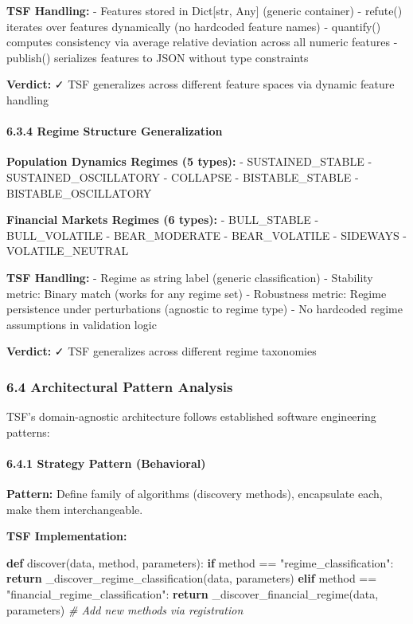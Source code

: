 \documentclass[
]{article}
\newenvironment{Shaded}{}{}
\newcommand{\CommentTok}[1]{\textcolor[rgb]{0.38,0.63,0.69}{\textit{#1}}}
\newcommand{\ControlFlowTok}[1]{\textcolor[rgb]{0.00,0.44,0.13}{\textbf{#1}}}
\newcommand{\KeywordTok}[1]{\textcolor[rgb]{0.00,0.44,0.13}{\textbf{#1}}}
\newcommand{\NormalTok}[1]{#1}
\newcommand{\OperatorTok}[1]{\textcolor[rgb]{0.40,0.40,0.40}{#1}}
\newcommand{\StringTok}[1]{\textcolor[rgb]{0.25,0.44,0.63}{#1}}
\begin{document}
\textbf{TSF Handling:} - Features stored in Dict{[}str, Any{]} (generic
container) - refute() iterates over features dynamically (no hardcoded
feature names) - quantify() computes consistency via average relative
deviation across all numeric features - publish() serializes features to
JSON without type constraints

\textbf{Verdict:} ✓ TSF generalizes across different feature spaces via
dynamic feature handling

\paragraph{6.3.4 Regime Structure
Generalization}\label{regime-structure-generalization}

\textbf{Population Dynamics Regimes (5 types):} - SUSTAINED\_STABLE -
SUSTAINED\_OSCILLATORY - COLLAPSE - BISTABLE\_STABLE -
BISTABLE\_OSCILLATORY

\textbf{Financial Markets Regimes (6 types):} - BULL\_STABLE -
BULL\_VOLATILE - BEAR\_MODERATE - BEAR\_VOLATILE - SIDEWAYS -
VOLATILE\_NEUTRAL

\textbf{TSF Handling:} - Regime as string label (generic classification)
- Stability metric: Binary match (works for any regime set) - Robustness
metric: Regime persistence under perturbations (agnostic to regime type)
- No hardcoded regime assumptions in validation logic

\textbf{Verdict:} ✓ TSF generalizes across different regime taxonomies

\subsubsection{6.4 Architectural Pattern
Analysis}\label{architectural-pattern-analysis}

TSF's domain-agnostic architecture follows established software
engineering patterns:

\paragraph{6.4.1 Strategy Pattern
(Behavioral)}\label{strategy-pattern-behavioral}

\textbf{Pattern:} Define family of algorithms (discovery methods),
encapsulate each, make them interchangeable.

\textbf{TSF Implementation:}

\begin{Shaded}
\begin{Highlighting}[]
\KeywordTok{def}\NormalTok{ discover(data, method, parameters):}
    \ControlFlowTok{if}\NormalTok{ method }\OperatorTok{==} \StringTok{"regime\_classification"}\NormalTok{:}
        \ControlFlowTok{return}\NormalTok{ \_discover\_regime\_classification(data, parameters)}
    \ControlFlowTok{elif}\NormalTok{ method }\OperatorTok{==} \StringTok{"financial\_regime\_classification"}\NormalTok{:}
        \ControlFlowTok{return}\NormalTok{ \_discover\_financial\_regime(data, parameters)}
    \CommentTok{\# Add new methods via registration}
\end{Highlighting}
\end{Shaded}
\end{document}
